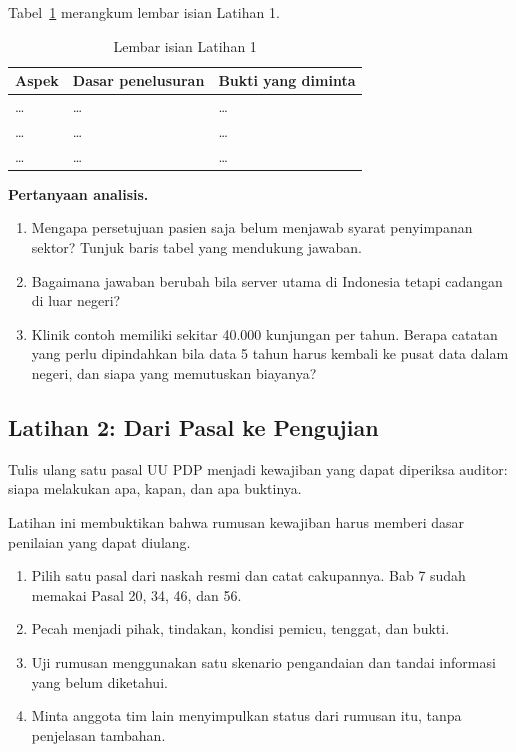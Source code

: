 Tabel~\ref{tab:ch03-lat1-hasil} merangkum lembar isian Latihan 1.
\begin{table}[!htb]
  \centering\small
  \caption{Lembar isian Latihan 1}\label{tab:ch03-lat1-hasil}
  \begin{tabularx}{\textwidth}{|>{\raggedright\arraybackslash}p{}|>{\raggedright\arraybackslash}X|>{\raggedright\arraybackslash}X|}
    \hline
    \textbf{Aspek} & \textbf{Dasar penelusuran} & \textbf{Bukti yang diminta} \\ \hline
    \dots & \dots & \dots \\ \hline
    \dots & \dots & \dots \\ \hline
    \dots & \dots & \dots \\ \hline
  \end{tabularx}
\end{table}

\textbf{Pertanyaan analisis.}
\begin{enumerate}
  \item Mengapa persetujuan pasien saja belum menjawab syarat penyimpanan sektor? Tunjuk baris tabel yang mendukung
  jawaban.
  \item Bagaimana jawaban berubah bila server utama di Indonesia tetapi cadangan di luar negeri?
  \item Klinik contoh memiliki sekitar 40.000 kunjungan per tahun. Berapa catatan yang perlu dipindahkan bila data 5
  tahun harus kembali ke pusat data dalam negeri, dan siapa yang memutuskan biayanya?
\end{enumerate}

\subsection*{Latihan 2: Dari Pasal ke Pengujian}

Tulis ulang satu pasal UU PDP menjadi kewajiban yang dapat diperiksa auditor: siapa melakukan apa, kapan, dan apa
buktinya.

Latihan ini membuktikan bahwa rumusan kewajiban harus memberi dasar penilaian yang dapat diulang.
\begin{enumerate}
  \item Pilih satu pasal dari naskah resmi dan catat cakupannya. Bab 7 sudah memakai Pasal 20, 34, 46, dan 56.
  \item Pecah menjadi pihak, tindakan, kondisi pemicu, tenggat, dan bukti.
  \item Uji rumusan menggunakan satu skenario pengandaian dan tandai informasi yang belum diketahui.
  \item Minta anggota tim lain menyimpulkan status dari rumusan itu, tanpa penjelasan tambahan.
\end{enumerate}

